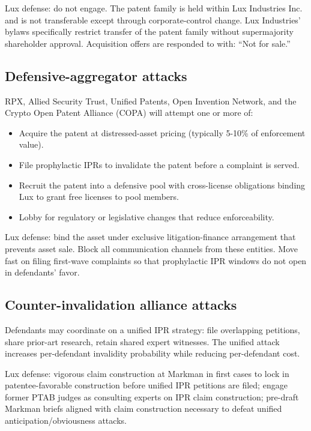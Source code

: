 \documentclass[11pt,letterpaper]{article}
\begin{document}
Lux defense: do not engage. The patent family is held within Lux Industries Inc. and is not transferable except through corporate-control change. Lux Industries' bylaws specifically restrict transfer of the patent family without supermajority shareholder approval. Acquisition offers are responded to with: ``Not for sale.''

\subsection{Defensive-aggregator attacks}

RPX, Allied Security Trust, Unified Patents, Open Invention Network, and the Crypto Open Patent Alliance (COPA) will attempt one or more of:

\begin{itemize}
\item Acquire the patent at distressed-asset pricing (typically 5-10\% of enforcement value).
\item File prophylactic IPRs to invalidate the patent before a complaint is served.
\item Recruit the patent into a defensive pool with cross-license obligations binding Lux to grant free licenses to pool members.
\item Lobby for regulatory or legislative changes that reduce enforceability.
\end{itemize}

Lux defense: bind the asset under exclusive litigation-finance arrangement that prevents asset sale. Block all communication channels from these entities. Move fast on filing first-wave complaints so that prophylactic IPR windows do not open in defendants' favor.

\subsection{Counter-invalidation alliance attacks}

Defendants may coordinate on a unified IPR strategy: file overlapping petitions, share prior-art research, retain shared expert witnesses. The unified attack increases per-defendant invalidity probability while reducing per-defendant cost.

Lux defense: vigorous claim construction at Markman in first cases to lock in patentee-favorable construction before unified IPR petitions are filed; engage former PTAB judges as consulting experts on IPR claim construction; pre-draft Markman briefs aligned with claim construction necessary to defeat unified anticipation/obviousness attacks.
\end{document}
